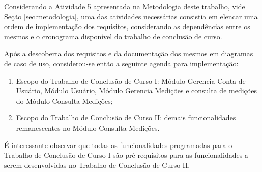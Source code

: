 Considerando a Atividade 5 apresentada na Metodologia deste trabalho, vide Seção \ref{sec:metodologia}, uma das atividades necessárias consistia em elencar uma ordem de implementação dos requisitos, considerando as dependências entre os mesmos e o cronograma disponível do trabalho de conclusão de curso.

Após a descoberta dos requisitos e da documentação dos mesmos em diagramas de caso de uso, considerou-se então a seguinte agenda para implementação:

\begin{enumerate}
  \item Escopo do Trabalho de Conclusão de Curso I: Módulo Gerencia Conta de Usuário, Módulo Usuário, Módulo Gerencia Medições e consulta de medições do Módulo Consulta Medições;
  \item Escopo do Trabalho de Conclusão de Curso II: demais funcionalidades remanescentes no Módulo Consulta Medições.
\end{enumerate}

É interessante observar que todas as funcionalidades programadas para o Trabalho de Conclusão de Curso I são pré-requisitos para as funcionalidades a serem desenvolvidas no Trabalho de Conclusão de Curso II.
